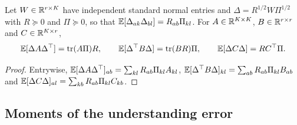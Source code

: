 \begin{lemma}\label{lem:lrn-isserlis}
Let $W\in\mathbb{R}^{r\times K}$ have independent standard normal entries and $\Delta=R^{1/2}W\Pi^{1/2}$ with $R\succeq0$ and $\Pi\succeq0$, so that $\mathbb{E}[\Delta_{ak}\Delta_{bl}]=R_{ab}\Pi_{kl}$. For $A\in\mathbb{R}^{K\times K}$, $B\in\mathbb{R}^{r\times r}$ and $C\in\mathbb{R}^{K\times r}$,
\begin{equation}\label{eq:lrn-isserlis}
\mathbb{E}[\Delta A\Delta^\top]=\operatorname{tr}(A\Pi)R,\qquad\mathbb{E}[\Delta^\top B\Delta]=\operatorname{tr}(BR)\Pi,\qquad\mathbb{E}[\Delta C\Delta]=RC^\top\Pi.
\end{equation}
\end{lemma}

\begin{proof}
Entrywise, $\mathbb{E}[\Delta A\Delta^\top]_{ab}=\sum_{kl}R_{ab}\Pi_{kl}A_{kl}$, $\mathbb{E}[\Delta^\top B\Delta]_{kl}=\sum_{ab}R_{ab}\Pi_{kl}B_{ab}$ and $\mathbb{E}[\Delta C\Delta]_{al}=\sum_{kb}R_{ab}\Pi_{kl}C_{kb}$.
\end{proof}

\subsection{Moments of the understanding error}

